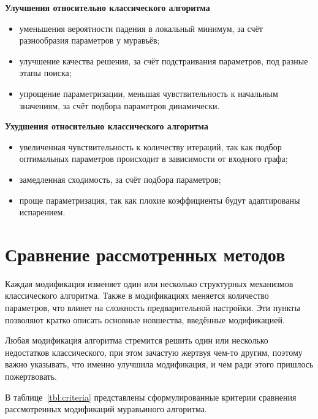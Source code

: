 \textbf{Улучшения относительно классического алгоритма}

\begin{itemize}
	\item уменьшения вероятности падения в локальный минимум, за счёт разнообразия параметров у муравьёв;
	\item улучшение качества решения, за счёт подстраивания параметров, под разные этапы поиска;
	\item упрощение параметризации, меньшая чувствительность к начальным значениям, за счёт подбора параметров динамически.
\end{itemize}

\textbf{Ухудшения относительно классического алгоритма}

\begin{itemize}
	\item увеличенная чувствительность к количеству итераций, так как подбор оптимальных параметров происходит в зависимости от входного графа;
	\item замедленная сходимость, за счёт подбора параметров;
	\item проще параметризация, так как плохие коэффициенты будут адаптированы испарением.
\end{itemize}

\section{Сравнение рассмотренных методов}

Каждая модификация изменяет один или несколько структурных механизмов классического алгоритма. Также в модификациях меняется количество параметров, что влияет на сложность предварительной настройки. Эти пункты позволяют кратко описать основные новшества, введённые модификацией.

Любая модификация алгоритма стремится решить один или несколько недостатков классического, при этом зачастую жертвуя чем-то другим, поэтому важно указывать, что именно улучшила модификация, и чем ради этого пришлось пожертвовать.

В таблице~\ref{tbl:criteria} представлены сформулированные критерии сравнения рассмотренных модификаций муравьиного алгоритма.

